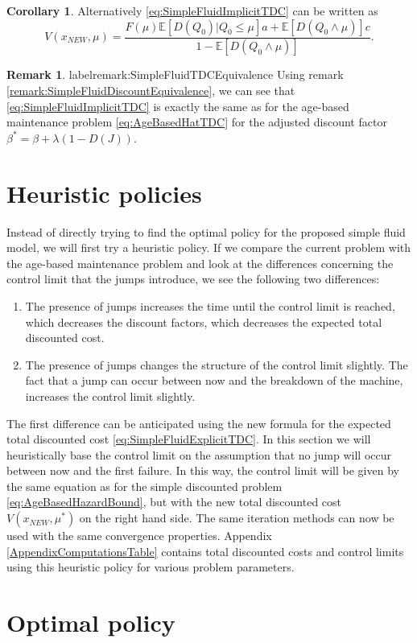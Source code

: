 \documentclass[a4paper]{thesis}
\theoremstyle{definition}
\newtheorem{remark}{Remark}[chapter]
\newtheorem{corollary}{Corollary}[chapter]
\begin{document}
\begin{corollary}
	Alternatively \eqref{eq:SimpleFluidImplicitTDC} can be written as
	\begin{equation}\label{eq:SimpleFluidExplicitTDC}
	V(x_{NEW},\mu)=\frac{F(\mu)\mathbb{E}[D(Q_0)|Q_0\leq \mu]a+\mathbb{E}[D(Q_0\wedge\mu)]c}{1-\mathbb{E}[D(Q_0\wedge\mu)]}.
	\end{equation}
\end{corollary}

\begin{remark}label{remark:SimpleFluidTDCEquivalence}
	Using remark \ref{remark:SimpleFluidDiscountEquivalence}, we can see that \eqref{eq:SimpleFluidImplicitTDC} is exactly the same as for the age-based maintenance problem \eqref{eq:AgeBasedHatTDC} for the adjusted discount factor $\beta^*=\beta+\lambda(1-D(J))$.
\end{remark} \section{Heuristic policies}
Instead of directly trying to find the optimal policy for the proposed simple fluid model, we will first try a heuristic policy.
If we compare the current problem with the age-based maintenance problem and look at the differences concerning the control limit that the jumps introduce, we see the following two differences:
\begin{enumerate}
	\item The presence of jumps increases the time until the control limit is reached, which decreases the discount factors, which decreases the expected total discounted cost.
	\item The presence of jumps changes the structure of the control limit slightly.
	The fact that a jump can occur between now and the breakdown of the machine, increases the control limit slightly.
\end{enumerate}
The first difference can be anticipated using the new formula for the expected total discounted cost \eqref{eq:SimpleFluidExplicitTDC}.
In this section we will heuristically base the control limit on the assumption that no jump will occur between now and the first failure.
In this way, the control limit will be given by the same equation as for the simple discounted problem \eqref{eq:AgeBasedHazardBound}, but with the new total discounted cost $V(x_{NEW},\mu^*)$ on the right hand side.
The same iteration methods can now be used with the same convergence properties.
Appendix \ref{AppendixComputationsTable} contains total discounted costs and control limits using this heuristic policy for various problem parameters. \section{Optimal policy}
\end{document}
